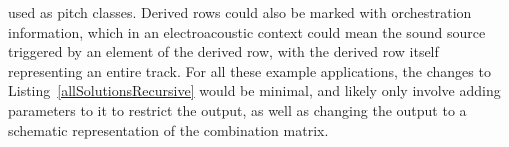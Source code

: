 used as pitch classes. Derived rows could also be marked with orchestration information, which in an electroacoustic context could mean the sound source triggered by an element of the derived row, with the derived row itself representing an entire track. For all these example applications, the changes to Listing~\ref{allSolutionsRecursive} would be minimal, and likely only involve adding parameters to it to restrict the output, as well as changing the output to a schematic representation of the combination matrix.
